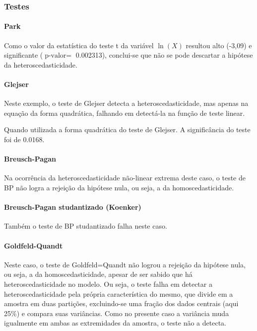 \documentclass[a4paper, 12pt]{article}
\let\oldparagraph\paragraph
\renewcommand{\paragraph}[1]{\oldparagraph{#1}\mbox{}}
\begin{document}
\hypertarget{testes-2}{%
\subsubsection{Testes}\label{testes-2}}

\hypertarget{park-2}{%
\paragraph{Park}\label{park-2}}

Como o valor da estatística do teste t da variável \(\ln(X)\) resultou
alto (-3,09) e significante (\(\text{p-valor} =\) 0.002313), conclui-se
que não se pode descartar a hipótese da heteroscedasticidade.

\hypertarget{glejser-2}{%
\paragraph{Glejser}\label{glejser-2}}

Neste exemplo, o teste de Glejser detecta a heteroscedasticidade, mas
apenas na equação da forma quadrática, falhando em detectá-la na função
de teste linear.

Quando utilizada a forma quadrática do teste de Glejser. A significância
do teste foi de 0.0168.

\hypertarget{breusch-pagan-2}{%
\paragraph{Breusch-Pagan}\label{breusch-pagan-2}}

Na ocorrência da heteroscedasticidade não-linear extrema deste caso, o
teste de BP não logra a rejeição da hipótese nula, ou seja, a da
homoscedasticidade.

\hypertarget{breusch-pagan-studantizado-koenker-2}{%
\paragraph{Breusch-Pagan studantizado
(Koenker)}\label{breusch-pagan-studantizado-koenker-2}}

Também o teste de BP studantizado falha neste caso.

\hypertarget{goldfeld-quandt-2}{%
\paragraph{Goldfeld-Quandt}\label{goldfeld-quandt-2}}

Neste caso, o teste de Goldfeld=Quandt não logrou a rejeição da hipótese
nula, ou seja, a da homoscedasticidade, apesar de ser sabido que há
heteroscedasticidade no modelo. Ou seja, o teste falha em detectar a
heteroscedasticidade pela própria característica do mesmo, que divide em
a amostra em duas partições, excluindo-se uma fração dos dados centrais
(aqui 25\%) e compara suas variâncias. Como no presente caso a variância
muda igualmente em ambas as extremidades da amostra, o teste não a
detecta.
\end{document}
